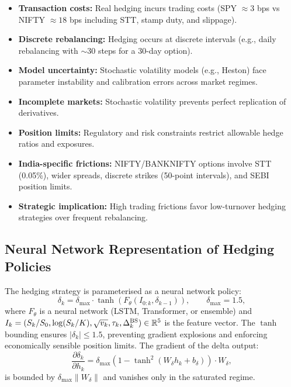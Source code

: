 \begin{itemize}[noitemsep]
    \item \textbf{Transaction costs:} Real hedging incurs trading costs (SPY $\approx 3$ bps vs NIFTY $\approx 18$ bps including STT, stamp duty, and slippage).
    
    \item \textbf{Discrete rebalancing:} Hedging occurs at discrete intervals (e.g., daily rebalancing with $\sim 30$ steps for a 30-day option).
    
    \item \textbf{Model uncertainty:} Stochastic volatility models (e.g., Heston) face parameter instability and calibration errors across market regimes.
    
    \item \textbf{Incomplete markets:} Stochastic volatility prevents perfect replication of derivatives.
    
    \item \textbf{Position limits:} Regulatory and risk constraints restrict allowable hedge ratios and exposures.
    
    \item \textbf{India-specific frictions:} NIFTY/BANKNIFTY options involve STT (0.05\%), wider spreads, discrete strikes (50-point intervals), and SEBI position limits.
    
    \item \textbf{Strategic implication:} High trading frictions favor low-turnover hedging strategies over frequent rebalancing.
\end{itemize}

\subsection{Neural Network Representation of Hedging Policies}

The hedging strategy is parameterised as a neural network policy:
\begin{equation}
    \delta_k = \delta_{\max} \cdot \tanh(F_\theta(I_{0:k}, \delta_{k-1})), \qquad \delta_{\max} = 1.5,
\end{equation}
where $F_\theta$ is a neural network (LSTM, Transformer, or ensemble) and $I_k = (S_k/S_0, \log(S_k/K), \sqrt{v_k}, \tau_k, \Delta_k^{\mathrm{BS}}) \in \mathbb{R}^5$ is the feature vector. The $\tanh$ bounding ensures $|\delta_k| \leq 1.5$, preventing gradient explosions and enforcing economically sensible position limits. The gradient of the delta output:
\begin{equation}
    \frac{\partial \delta_k}{\partial h_k} = \delta_{\max}(1 - \tanh^2(W_\delta h_k + b_\delta)) \cdot W_\delta,
\end{equation}
is bounded by $\delta_{\max}\|W_\delta\|$ and vanishes only in the saturated regime.

